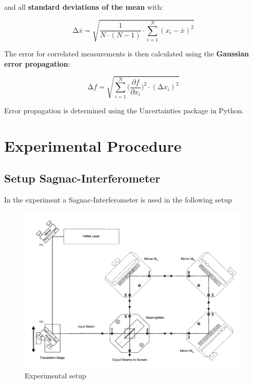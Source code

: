 and all \textbf{standard deviations of the mean} with:

\begin{equation}
	\increment\overline{x} = \sqrt{\frac{1}{N\cdot(N-1)}\cdot\sum_{i=1}^N (x_i-\overline{x})^2}
	\label{eqn:St_Mittelwert}
\end{equation}

The error for correlated measurements is then calculated using the
\textbf{Gaussian error propagation}:

\begin{equation}
	\increment{f} = \sqrt{ \sum_{i = 1}^{N}  \biggl(\frac{\partial{f}}{\partial{x_i}}\biggr)^2\cdot(\increment{x_i})^2}
	\label{eqn:Gauss}
\end{equation}

Error propagation is determined using the Uncertainties \cite{uncertainties}
package in Python.


\section{Experimental Procedure}
\subsection{Setup Sagnac-Interferometer}
In the experiment a Sagnac-Interferometer is used in the following setup

\begin{figure}[H]
	\centering
	\includegraphics[width=\textwidth]{Bilder/Aufbau.png}
	\caption{Experimental setup \cite{man:v64}}\label{fig:Aufbau}
\end{figure}

